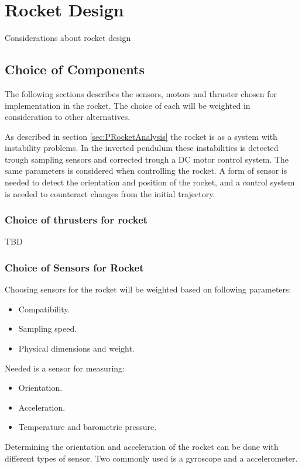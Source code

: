 
\chapter{Rocket Design}

Considerations about rocket design

\section{Choice of Components}
The following sections describes the sensors, motors and thruster chosen for implementation in the rocket. The choice of each will be weighted in consideration to other alternatives.   

As described in section \ref{sec:PRocketAnalysis} the rocket is as a system with instability problems. In the inverted pendulum these instabilities is detected trough sampling sensors and corrected trough a DC motor control system. The same parameters is considered when controlling the rocket. A form of sensor is needed to detect the orientation and position of the rocket, and a control system is needed to counteract changes from the initial trajectory.

\subsection{Choice of thrusters for rocket}
TBD

\subsection{Choice of Sensors for Rocket}
Choosing sensors for the rocket will be weighted based on following parameters:

\begin{itemize}[noitemsep]
\item Compatibility.
\item Sampling speed.
\item Physical dimensions and weight.
\end{itemize}

Needed is a sensor for measuring:
\begin{itemize}[noitemsep]
\item Orientation.
\item Acceleration.
\item Temperature and barometric pressure.
\end{itemize}

Determining the orientation and acceleration of the rocket can be done with different types of sensor. Two commonly used is a gyroscope and a accelerometer. 


